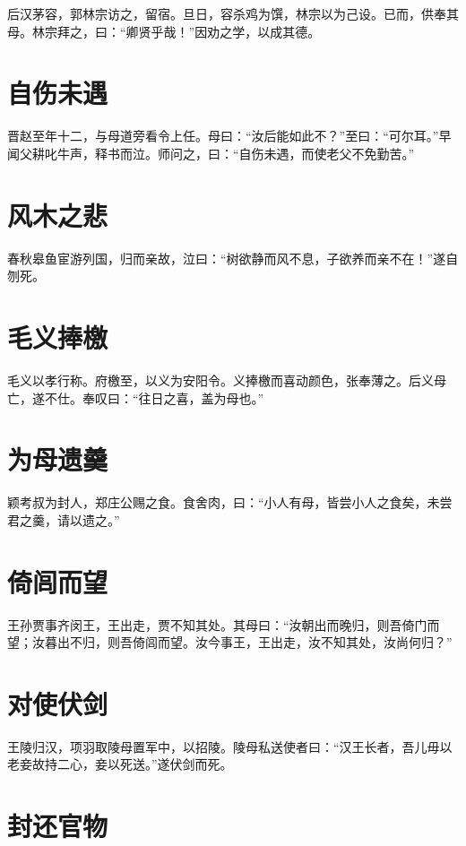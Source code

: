 \documentclass[a4paper,12pt,UTF8,twoside]{ctexbook}
\begin{document}
    后汉茅容，郭林宗访之，留宿。旦日，容杀鸡为馔，林宗以为己设。已而，供奉其母。林宗拜之，曰：“卿贤乎哉！”因劝之学，以成其德。
    
    \section{自伤未遇}
    
    晋赵至年十二，与母道旁看令上任。母曰：“汝后能如此不？”至曰：“可尔耳。”早闻父耕叱牛声，释书而泣。师问之，曰：“自伤未遇，而使老父不免勤苦。”
    
    \section{风木之悲}
    
    春秋皋鱼宦游列国，归而亲故，泣曰：“树欲静而风不息，子欲养而亲不在！”遂自刎死。
    
    \section{毛义捧檄}
    
    毛义以孝行称。府檄至，以义为安阳令。义捧檄而喜动颜色，张奉薄之。后义母亡，遂不仕。奉叹曰：“往日之喜，盖为母也。”
    
    \section{为母遗羹}
    
    颖考叔为封人，郑庄公赐之食。食舍肉，曰：“小人有母，皆尝小人之食矣，未尝君之羹，请以遗之。”
    
    \section{倚闾而望}
    
    王孙贾事齐闵王，王出走，贾不知其处。其母曰：“汝朝出而晚归，则吾倚门而望；汝暮出不归，则吾倚闾而望。汝今事王，王出走，汝不知其处，汝尚何归？”
    
    \section{对使伏剑}
    
    王陵归汉，项羽取陵母置军中，以招陵。陵母私送使者曰：“汉王长者，吾儿毋以老妾故持二心，妾以死送。”遂伏剑而死。
    
    \section{封还官物}
    
\end{document}
